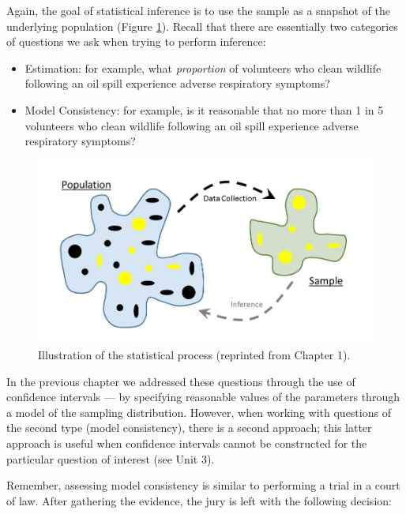 \documentclass[
]{book}
\providecommand{\tightlist}{%
  \setlength{\itemsep}{0pt}\setlength{\parskip}{0pt}}
\theoremstyle{plain}
\theoremstyle{mydefn}
\theoremstyle{myexmpl}
\theoremstyle{remark}
\begin{document}
Again, the goal of statistical inference is to use the sample as a snapshot of the underlying population (Figure \ref{fig:nulldistns-statistical-process}). Recall that there are essentially two categories of questions we ask when trying to perform inference:

\begin{itemize}
\tightlist
\item
  Estimation: for example, what \emph{proportion} of volunteers who clean wildlife following an oil spill experience adverse respiratory symptoms?
\item
  Model Consistency: for example, is it reasonable that no more than 1 in 5 volunteers who clean wildlife following an oil spill experience adverse respiratory symptoms?
\end{itemize}

\begin{figure}

{\centering \includegraphics[width=0.8\linewidth]{images/Basics-Stat-Process} 

}

\caption{Illustration of the statistical process (reprinted from Chapter 1).}\label{fig:nulldistns-statistical-process}
\end{figure}

In the previous chapter we addressed these questions through the use of confidence intervals --- by specifying reasonable values of the parameters through a model of the sampling distribution. However, when working with questions of the second type (model consistency), there is a second approach; this latter approach is useful when confidence intervals cannot be constructed for the particular question of interest (see Unit 3).

Remember, assessing model consistency is similar to performing a trial in a court of law. After gathering the evidence, the jury is left with the following decision:
\end{document}
